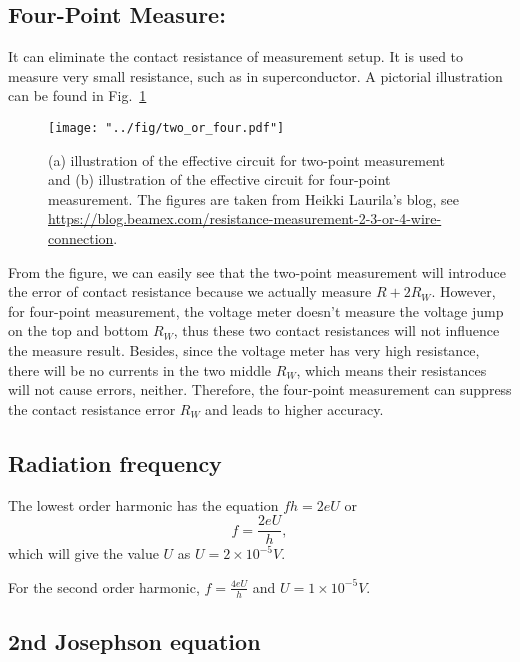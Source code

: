 \subsection{Four-Point Measure:}

It can eliminate the contact resistance of measurement setup. It is
used to measure very small resistance, such as in superconductor.
A pictorial illustration can be found in Fig.\ \ref{two_or_four}

\begin{figure}
\texttt{[image: "../fig/two\_or\_four.pdf"]}

\caption{(a) illustration of the effective circuit for two-point measurement
and (b) illustration of the effective circuit for four-point measurement.
The figures are taken from Heikki Laurila's blog, see \protect\href{https://blog.beamex.com/resistance-measurement-2-3-or-4-wire-connection}{https://blog.beamex.com/resistance-measurement-2-3-or-4-wire-connection}. }

\label{two_or_four}
\end{figure}
From the figure, we can easily see that the two-point measurement
will introduce the error of contact resistance because we actually
measure $R+2R_{W}$. However, for four-point measurement, the voltage
meter doesn't measure the voltage jump on the top and bottom $R_{W}$,
thus these two contact resistances will not influence the measure
result. Besides, since the voltage meter has very high resistance,
there will be no currents in the two middle $R_{W}$, which means
their resistances will not cause errors, neither. Therefore, the four-point
measurement can suppress the contact resistance error $R_{W}$ and
leads to higher accuracy. 

\subsection{Radiation frequency}

The lowest order harmonic has the equation $fh=2eU$ or 
\begin{equation}
f=\frac{2eU}{h},
\end{equation}
 which will give the value $U$ as $U=2\times10^{-5}V$.

For the second order harmonic, $f=\frac{4eU}{h}$ and $U=1\times10^{-5}V$.

\subsection{2nd Josephson equation}

